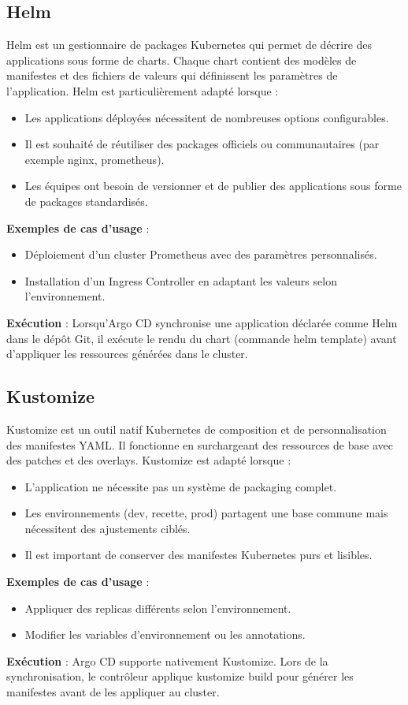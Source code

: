 \subsection{Helm}

Helm est un gestionnaire de packages Kubernetes qui permet de décrire des applications sous forme de charts. Chaque chart contient des modèles de manifestes et des fichiers de valeurs qui définissent les paramètres de l’application. Helm est particulièrement adapté lorsque :
\begin{itemize}
	\item Les applications déployées nécessitent de nombreuses options configurables.
	\item Il est souhaité de réutiliser des packages officiels ou communautaires (par exemple nginx, prometheus).
	\item Les équipes ont besoin de versionner et de publier des applications sous forme de packages standardisés.
\end{itemize}
\textbf{Exemples de cas d’usage} :
\begin{itemize}
	\item Déploiement d’un cluster Prometheus avec des paramètres personnalisés.
	\item Installation d’un Ingress Controller en adaptant les valeurs selon l’environnement.
\end{itemize}
\textbf{Exécution} : Lorsqu’Argo CD synchronise une application déclarée comme Helm dans le dépôt Git, il exécute le rendu du chart (commande helm template) avant d’appliquer les ressources générées dans le cluster.

\subsection{Kustomize}

Kustomize est un outil natif Kubernetes de composition et de personnalisation des manifestes YAML. Il fonctionne en surchargeant des ressources de base avec des patches et des overlays. Kustomize est adapté lorsque :
\begin{itemize}
	\item L’application ne nécessite pas un système de packaging complet.
	\item Les environnements (dev, recette, prod) partagent une base commune mais nécessitent des ajustements ciblés.
	\item Il est important de conserver des manifestes Kubernetes purs et lisibles.
\end{itemize}
\textbf{Exemples de cas d’usage} :
\begin{itemize}
	\item Appliquer des replicas différents selon l’environnement.
	\item Modifier les variables d’environnement ou les annotations.
\end{itemize}
\textbf{Exécution} : Argo CD supporte nativement Kustomize. Lors de la synchronisation, le contrôleur applique kustomize build pour générer les manifestes avant de les appliquer au cluster.

